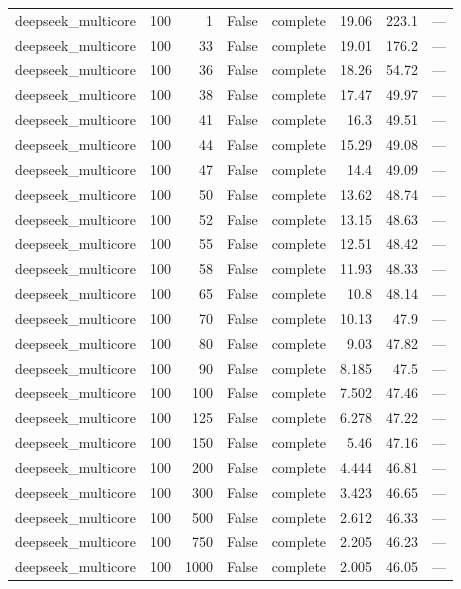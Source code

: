 \begin{tabular}{lrrrlrrl}
deepseek\_multicore & 100 & 1 & False & complete & 19.06 & 223.1 & — \\
deepseek\_multicore & 100 & 33 & False & complete & 19.01 & 176.2 & — \\
deepseek\_multicore & 100 & 36 & False & complete & 18.26 & 54.72 & — \\
deepseek\_multicore & 100 & 38 & False & complete & 17.47 & 49.97 & — \\
deepseek\_multicore & 100 & 41 & False & complete & 16.3 & 49.51 & — \\
deepseek\_multicore & 100 & 44 & False & complete & 15.29 & 49.08 & — \\
deepseek\_multicore & 100 & 47 & False & complete & 14.4 & 49.09 & — \\
deepseek\_multicore & 100 & 50 & False & complete & 13.62 & 48.74 & — \\
deepseek\_multicore & 100 & 52 & False & complete & 13.15 & 48.63 & — \\
deepseek\_multicore & 100 & 55 & False & complete & 12.51 & 48.42 & — \\
deepseek\_multicore & 100 & 58 & False & complete & 11.93 & 48.33 & — \\
deepseek\_multicore & 100 & 65 & False & complete & 10.8 & 48.14 & — \\
deepseek\_multicore & 100 & 70 & False & complete & 10.13 & 47.9 & — \\
deepseek\_multicore & 100 & 80 & False & complete & 9.03 & 47.82 & — \\
deepseek\_multicore & 100 & 90 & False & complete & 8.185 & 47.5 & — \\
deepseek\_multicore & 100 & 100 & False & complete & 7.502 & 47.46 & — \\
deepseek\_multicore & 100 & 125 & False & complete & 6.278 & 47.22 & — \\
deepseek\_multicore & 100 & 150 & False & complete & 5.46 & 47.16 & — \\
deepseek\_multicore & 100 & 200 & False & complete & 4.444 & 46.81 & — \\
deepseek\_multicore & 100 & 300 & False & complete & 3.423 & 46.65 & — \\
deepseek\_multicore & 100 & 500 & False & complete & 2.612 & 46.33 & — \\
deepseek\_multicore & 100 & 750 & False & complete & 2.205 & 46.23 & — \\
deepseek\_multicore & 100 & 1000 & False & complete & 2.005 & 46.05 & — \\

\end{tabular}

